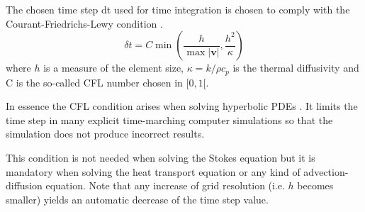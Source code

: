 The chosen time step dt used for time integration is chosen to
comply with the Courant-Friedrichs-Lewy condition \cite{cfd_anderson}.
\[
\delta t = C \min \left( \frac{h}{\max |{\bm v}|} , \frac{h^2}{\kappa}  \right)
\]
where $h$ is a measure of the element size, $\kappa = k/ \rho c_p$ 
is the thermal diffusivity and C is the so-called CFL number chosen in $[0,1[$.

In essence the CFL condition arises when solving hyperbolic PDEs .
It limits the time step in many explicit time-marching computer simulations
so that the simulation does not produce incorrect results. 

This condition is not needed when solving the Stokes equation but it is mandatory 
when solving the heat transport equation or any kind of advection-diffusion equation. 
Note that any increase of grid resolution (i.e. $h$ becomes smaller) yields an automatic 
decrease of the time step value.






